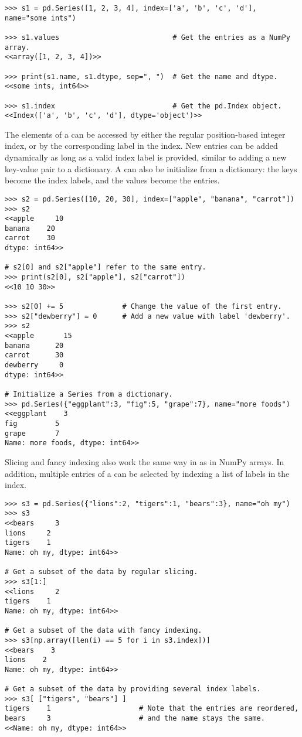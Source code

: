 \begin{lstlisting}
>>> s1 = pd.Series([1, 2, 3, 4], index=['a', 'b', 'c', 'd'], name="some ints")

>>> s1.values                           # Get the entries as a NumPy array.
<<array([1, 2, 3, 4])>>

>>> print(s1.name, s1.dtype, sep=", ")  # Get the name and dtype.
<<some ints, int64>>

>>> s1.index                            # Get the pd.Index object.
<<Index(['a', 'b', 'c', 'd'], dtype='object')>>
\end{lstlisting}

The elements of a  can be accessed by either the regular position-based integer index, or by the corresponding label in the index.
New entries can be added dynamically as long as a valid index label is provided, similar to adding a new key-value pair to a dictionary.
A  can also be initialize from a dictionary: the keys become the index labels, and the values become the entries.

\begin{lstlisting}
>>> s2 = pd.Series([10, 20, 30], index=["apple", "banana", "carrot"])
>>> s2
<<apple     10
banana    20
carrot    30
dtype: int64>>

# s2[0] and s2["apple"] refer to the same entry.
>>> print(s2[0], s2["apple"], s2["carrot"])
<<10 10 30>>

>>> s2[0] += 5              # Change the value of the first entry.
>>> s2["dewberry"] = 0      # Add a new value with label 'dewberry'.
>>> s2
<<apple       15
banana      20
carrot      30
dewberry     0
dtype: int64>>

# Initialize a Series from a dictionary.
>>> pd.Series({"eggplant":3, "fig":5, "grape":7}, name="more foods")
<<eggplant    3
fig         5
grape       7
Name: more foods, dtype: int64>>
\end{lstlisting}

Slicing and fancy indexing also work the same way in  as in NumPy arrays.
In addition, multiple entries of a  can be selected by indexing a list of labels in the index.

\begin{lstlisting}
>>> s3 = pd.Series({"lions":2, "tigers":1, "bears":3}, name="oh my")
>>> s3
<<bears     3
lions     2
tigers    1
Name: oh my, dtype: int64>>

# Get a subset of the data by regular slicing.
>>> s3[1:]
<<lions     2
tigers    1
Name: oh my, dtype: int64>>

# Get a subset of the data with fancy indexing.
>>> s3[np.array([len(i) == 5 for i in s3.index])]
<<bears    3
lions    2
Name: oh my, dtype: int64>>

# Get a subset of the data by providing several index labels.
>>> s3[ ["tigers", "bears"] ]
tigers    1                     # Note that the entries are reordered,
bears     3                     # and the name stays the same.
<<Name: oh my, dtype: int64>>
\end{lstlisting}

